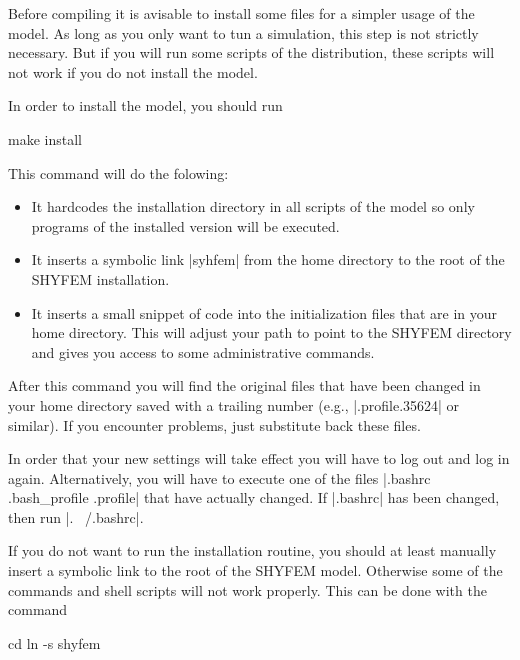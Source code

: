 
\newcommand{\sysfiles}{.bashrc .bash\_profile .profile}

Before compiling it is avisable to install some files for a simpler
usage of the model. As long as you only want to tun a simulation, this
step is not strictly necessary. But if you will run some scripts of the
distribution, these scripts will not work if you do not install the model.

In order to install the model, you should run

\begin{code}
    make install
\end{code}

This command will do the folowing:

\begin{itemize}

\item It hardcodes the installation directory in all scripts of the
model so only programs of the installed version will be executed.

\item It inserts a symbolic link |syhfem| from the home directory to
the root of the SHYFEM installation.

\item It inserts a small snippet of code into the initialization files
\ttt{\sysfiles} that are in your home directory. This will adjust your
path to point to the SHYFEM directory and gives you access to some
administrative commands.

\end{itemize}

After this command you will find the original files that have been changed
in your home directory saved with a trailing number (e.g., |.profile.35624|
or similar).  If you encounter problems, just substitute back these files.

In order that your new settings will take effect you will have to log
out and log in again. Alternatively, you will have to execute one of
the files |\sysfiles| that have actually changed. If |.bashrc| has been
changed, then run |. ~/.bashrc|.

If you do not want to run the installation routine, you should at least
manually insert a symbolic link to the root of the SHYFEM model.
Otherwise some of the commands and shell scripts will not work
properly. This can be done with the command

\begin{codem}
    cd
    ln -s \shydir shyfem
\end{codem}

